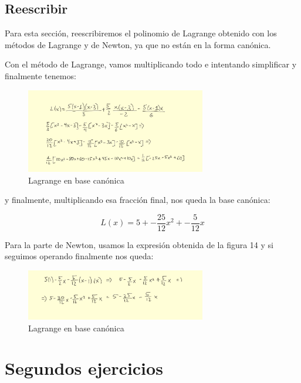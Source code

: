 \documentclass{article}
\begin{document}
\newpage


\subsection{Reescribir}

Para esta sección, reescribiremos el polinomio de Lagrange obtenido con los métodos de Lagrange y de Newton, ya que no están en la forma canónica.

Con el método de Lagrange, vamos multiplicando todo e intentando simplificar y finalmente tenemos:

\begin{figure}[h]
  \center
  \includegraphics[width=0.7\textwidth]{src/expresionbase1.jpg}
  \caption{Lagrange en base canónica}
\end{figure}

y finalmente, multiplicando esa fracción final, nos queda la base canónica:

\begin{equation}
  L(x) = 5 + -\frac{25}{12}x^{2} + -\frac{5}{12}x
\end{equation}

Para la parte de Newton, usamos la expresión obtenida de la figura 14 y si seguimos operando finalmente nos queda:

\begin{figure}[h]
  \center
  \includegraphics[width=0.7\textwidth]{src/expresionbase2.jpg}
  \caption{Lagrange en base canónica}
\end{figure}

\newpage

\section{Segundos ejercicios}
\end{document}
